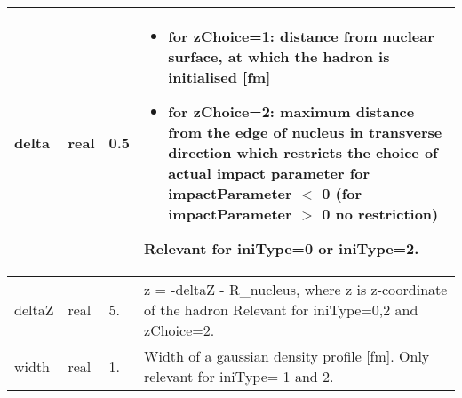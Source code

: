 \documentclass{article}
\begin{document}
\begin{longtable}{llll}
delta & \begin{minipage}[t]{2cm}real\end{minipage} & \begin{minipage}[t]{2cm}0.5\end{minipage} & \begin{minipage}[t]{12cm}\begin{itemize}\leftmargin0em\itemindent0pt\item for zChoice=1: distance from nuclear surface, at which the hadron is   initialised [fm]\item for zChoice=2: maximum distance from the edge of nucleus in transverse   direction which restricts the choice of actual impact parameter for   impactParameter $<$ 0 (for impactParameter $>$ 0 no restriction)\end{itemize} Relevant for iniType=0 or  iniType=2.\end{minipage}\\*
\midrule
deltaZ & \begin{minipage}[t]{2cm}real\end{minipage} & \begin{minipage}[t]{2cm}5.\end{minipage} & \begin{minipage}[t]{12cm}z = -deltaZ - R\_nucleus, where z is z-coordinate of the hadron Relevant for iniType=0,2 and zChoice=2.\end{minipage}\\*
\midrule
width & \begin{minipage}[t]{2cm}real\end{minipage} & \begin{minipage}[t]{2cm}1.\end{minipage} & \begin{minipage}[t]{12cm}Width of a gaussian density profile [fm]. Only relevant for iniType= 1 and 2.\end{minipage}\\*
\bottomrule
\end{longtable}
{ }



\end{document}
